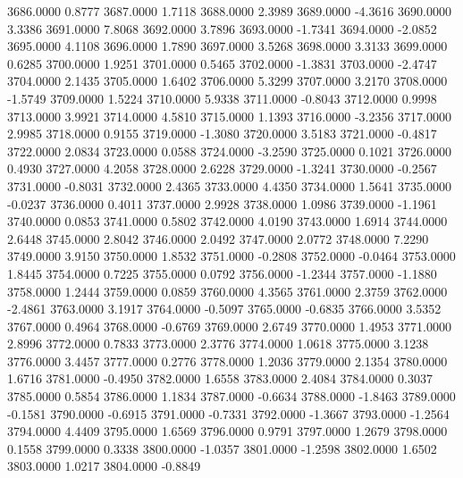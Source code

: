 3686.0000      0.8777
3687.0000      1.7118
3688.0000      2.3989
3689.0000     -4.3616
3690.0000      3.3386
3691.0000      7.8068
3692.0000      3.7896
3693.0000     -1.7341
3694.0000     -2.0852
3695.0000      4.1108
3696.0000      1.7890
3697.0000      3.5268
3698.0000      3.3133
3699.0000      0.6285
3700.0000      1.9251
3701.0000      0.5465
3702.0000     -1.3831
3703.0000     -2.4747
3704.0000      2.1435
3705.0000      1.6402
3706.0000      5.3299
3707.0000      3.2170
3708.0000     -1.5749
3709.0000      1.5224
3710.0000      5.9338
3711.0000     -0.8043
3712.0000      0.9998
3713.0000      3.9921
3714.0000      4.5810
3715.0000      1.1393
3716.0000     -3.2356
3717.0000      2.9985
3718.0000      0.9155
3719.0000     -1.3080
3720.0000      3.5183
3721.0000     -0.4817
3722.0000      2.0834
3723.0000      0.0588
3724.0000     -3.2590
3725.0000      0.1021
3726.0000      0.4930
3727.0000      4.2058
3728.0000      2.6228
3729.0000     -1.3241
3730.0000     -0.2567
3731.0000     -0.8031
3732.0000      2.4365
3733.0000      4.4350
3734.0000      1.5641
3735.0000     -0.0237
3736.0000      0.4011
3737.0000      2.9928
3738.0000      1.0986
3739.0000     -1.1961
3740.0000      0.0853
3741.0000      0.5802
3742.0000      4.0190
3743.0000      1.6914
3744.0000      2.6448
3745.0000      2.8042
3746.0000      2.0492
3747.0000      2.0772
3748.0000      7.2290
3749.0000      3.9150
3750.0000      1.8532
3751.0000     -0.2808
3752.0000     -0.0464
3753.0000      1.8445
3754.0000      0.7225
3755.0000      0.0792
3756.0000     -1.2344
3757.0000     -1.1880
3758.0000      1.2444
3759.0000      0.0859
3760.0000      4.3565
3761.0000      2.3759
3762.0000     -2.4861
3763.0000      3.1917
3764.0000     -0.5097
3765.0000     -0.6835
3766.0000      3.5352
3767.0000      0.4964
3768.0000     -0.6769
3769.0000      2.6749
3770.0000      1.4953
3771.0000      2.8996
3772.0000      0.7833
3773.0000      2.3776
3774.0000      1.0618
3775.0000      3.1238
3776.0000      3.4457
3777.0000      0.2776
3778.0000      1.2036
3779.0000      2.1354
3780.0000      1.6716
3781.0000     -0.4950
3782.0000      1.6558
3783.0000      2.4084
3784.0000      0.3037
3785.0000      0.5854
3786.0000      1.1834
3787.0000     -0.6634
3788.0000     -1.8463
3789.0000     -0.1581
3790.0000     -0.6915
3791.0000     -0.7331
3792.0000     -1.3667
3793.0000     -1.2564
3794.0000      4.4409
3795.0000      1.6569
3796.0000      0.9791
3797.0000      1.2679
3798.0000      0.1558
3799.0000      0.3338
3800.0000     -1.0357
3801.0000     -1.2598
3802.0000      1.6502
3803.0000      1.0217
3804.0000     -0.8849
